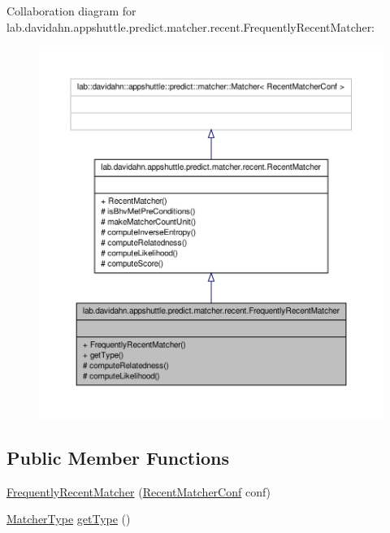 \-Collaboration diagram for lab.\-davidahn.\-appshuttle.\-predict.\-matcher.\-recent.\-Frequently\-Recent\-Matcher\-:
\nopagebreak
\begin{figure}[H]
\begin{center}
\leavevmode
\includegraphics[width=350pt]{classlab_1_1davidahn_1_1appshuttle_1_1predict_1_1matcher_1_1recent_1_1_frequently_recent_matcher__coll__graph}
\end{center}
\end{figure}
\subsection*{\-Public \-Member \-Functions}
\begin{DoxyCompactItemize}
\item 
\hyperlink{classlab_1_1davidahn_1_1appshuttle_1_1predict_1_1matcher_1_1recent_1_1_frequently_recent_matcher_a0b069b96a7dd8ed61f10df13f179a2b0}{\-Frequently\-Recent\-Matcher} (\hyperlink{classlab_1_1davidahn_1_1appshuttle_1_1predict_1_1matcher_1_1recent_1_1_recent_matcher_conf}{\-Recent\-Matcher\-Conf} conf)
\item 
\hyperlink{enumlab_1_1davidahn_1_1appshuttle_1_1predict_1_1matcher_1_1_matcher_type}{\-Matcher\-Type} \hyperlink{classlab_1_1davidahn_1_1appshuttle_1_1predict_1_1matcher_1_1recent_1_1_frequently_recent_matcher_acc1449bb693f075ee96aaa1407025c08}{get\-Type} ()
\end{DoxyCompactItemize}
